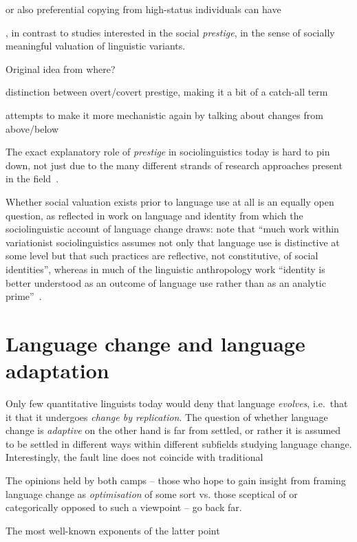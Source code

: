 or also preferential copying from high-status individuals can have

, in contrast to studies interested in the social \emph{prestige}, in the sense of socially meaningful valuation of linguistic variants.

Original idea from where?

distinction between overt/covert prestige, making it a bit of a catch-all term

attempts to make it more mechanistic again by talking about changes from above/below

The exact explanatory role of \emph{prestige} in sociolinguistics today is hard to pin down, not just due to the many different strands of research approaches present in the field~\citep{Tagliamonte2015}.

Whether social valuation exists prior to language use at all is an equally open question, as reflected in work on language and identity from which the sociolinguistic account of language change draws: \citeauthor{Bucholtz2004} note that ``much work within variationist sociolinguistics assumes not only that language use is distinctive at some level but that such practices are reflective, not constitutive, of social identities'', whereas in much of the linguistic anthropology work ``identity is better understood as an outcome of language use rather than as an analytic prime''~\citeyear[p.376]{Bucholtz2004}.

\section{Language change and language adaptation}\label{sec:adaptationism}

Only few quantitative linguists today would deny that language \emph{evolves}, i.e.~that it that it undergoes \emph{change by replication}. The question of whether language change is \emph{adaptive} on the other hand is far from settled, or rather it is assumed to be settled in different ways within different subfields studying language change. Interestingly, the fault line does not coincide with traditional 



The opinions held by both camps -- those who hope to gain insight from framing language change as \emph{optimisation} of some sort vs. those sceptical of or categorically opposed to such a viewpoint -- go back far.

The most well-known exponents of the latter point 

